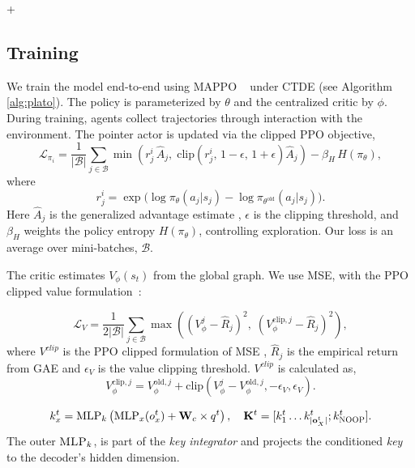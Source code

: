 

+

\subsection{Training}


We train the model end-to-end using MAPPO ~\cite{mappo} under CTDE (see Algorithm \ref{alg:plato}). The policy is parameterized by $\theta$ and the centralized critic by $\phi$. During training, agents collect trajectories through interaction with the environment. The pointer actor is updated via the clipped PPO objective,
\begin{equation}
\mathcal{L}_{\pi_i} =
\frac{1}{|\mathcal{B}|}\sum_{j \in \mathcal{B}}
\min\!\left(r_j^i\,\hat{A}_j,\;
\mathrm{clip}\!\left(r_j^i,\,1-\epsilon,\,1+\epsilon\right)\hat{A}_j\right)
- \beta_H\, H(\pi_\theta),
\end{equation}
where
\begin{equation}
r_j^i=\exp\!\big(\log \pi_\theta(a_j|s_j)-\log \pi_{\theta^{\mathrm{old}}}(a_j|s_j)\big).
\end{equation}
Here $\hat{A}_j$ is the generalized advantage estimate \cite{gae}, $\epsilon$ is the clipping threshold, and $\beta_H$ weights the policy entropy $H(\pi_\theta)$, controlling exploration. Our loss is  an average over mini-batches, $\mathcal{B}$. 

The critic estimates $V_\phi(s_t)$ from the global graph. We use MSE, with the PPO clipped value formulation~\cite{ppo}: 

\begin{equation}
\mathcal{L}_V=
\frac{1}{2|\mathcal{B}|}\sum_{j \in \mathcal{B}}
\max\!\left(\left(V_\phi^j-\hat{R}_j\right)^2,\;
\left(V_\phi^{\mathrm{clip},j}-\hat{R}_j\right)^2\right),
\end{equation}
where $V^{clip}$ is the PPO clipped formulation of MSE \cite{ppo}, $\hat{R}_j$ is the empirical return from GAE and $\epsilon_V$ is the value clipping threshold. $V^{clip}$ is calculated as,
\begin{equation}
V_\phi^{\mathrm{clip},j}=V_\phi^{\mathrm{old},j}+\mathrm{clip}\!\left(V_\phi^j-V_\phi^{\mathrm{old},j},-\epsilon_V,\epsilon_V\right).
\end{equation}

\begin{equation}\label{eq:key-integrator-eq}
k^t_x = \mathrm{MLP}_k\left (\mathrm{MLP}_x(o^t_x) + \mathbf{W}_c \times q^t \right ), \quad 
\mathbf{K}^t = [k^t_1 \dots k^t_{|\mathbf{o}^t_X|}; k^t_{\textsc{NOOP}}].
\end{equation}
The outer $\textsc{MLP}_k$, is part of the \emph{key integrator} and projects the conditioned \emph{key} to the decoder's hidden dimension.

